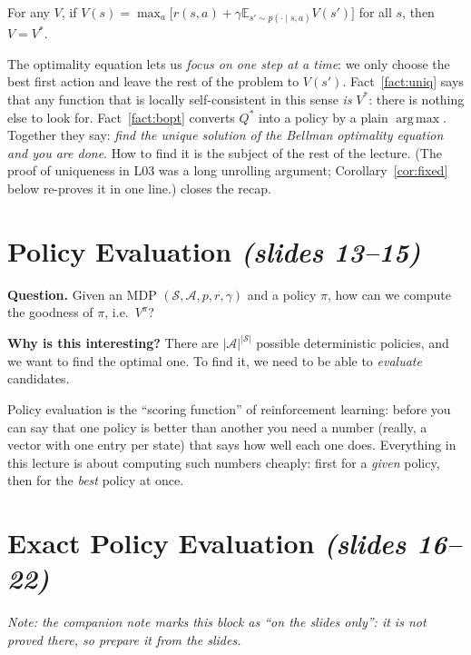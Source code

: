 \documentclass[11pt,a4paper]{article}
\newcommand{\E}{\mathbb{E}}
\DeclareMathOperator*{\argmax}{arg\,max}
\newcommand{\slides}[1]{\emph{(slides #1)}}
\newcommand{\cS}{\mathcal{S}}
\newcommand{\cA}{\mathcal{A}}
\theoremstyle{plain}
\theoremstyle{definition}
\theoremstyle{remark}
\begin{document}
\begin{fact}\label{fact:uniq}
For any $V$, if $V(s)=\max_a\big[r(s,a)+\gamma\E_{s'\sim p(\cdot\mid s,a)}V(s')\big]$ for all $s$, then $V=V^*$.
\end{fact}

\begin{intuition}
The optimality equation lets us \emph{focus on one step at a time}: we only choose the best first action and leave the rest of the problem to $V(s')$. Fact~\ref{fact:uniq} says that any function that is locally self-consistent in this sense \emph{is} $V^*$: there is nothing else to look for. Fact~\ref{fact:bopt} converts $Q^*$ into a policy by a plain $\argmax$. Together they say: \emph{find the unique solution of the Bellman optimality equation and you are done}. How to find it is the subject of the rest of the lecture. (The proof of uniqueness in L03 was a long unrolling argument; Corollary~\ref{cor:fixed} below re-proves it in one line.)  closes the recap.
\end{intuition}
\section{Policy Evaluation \slides{13--15}}
\textbf{Question.} Given an MDP $(\cS,\cA,p,r,\gamma)$ and a policy $\pi$, how can we compute the goodness of $\pi$, i.e.\ $V^\pi$?

\textbf{Why is this interesting?} There are $|\cA|^{|\cS|}$ possible deterministic policies, and we want to find the optimal one. To find it, we need to be able to \emph{evaluate} candidates.

\begin{intuition}
Policy evaluation is the ``scoring function'' of reinforcement learning: before you can say that one policy is better than another you need a number (really, a vector with one entry per state) that says how well each one does. Everything in this lecture is about computing such numbers cheaply: first for a \emph{given} policy, then for the \emph{best} policy at once.
\end{intuition}

\section{Exact Policy Evaluation \slides{16--22}}\label{sec:exact}
\emph{Note: the companion note marks this block as ``on the slides only'': it is not proved there, so prepare it from the slides.}
\end{document}
